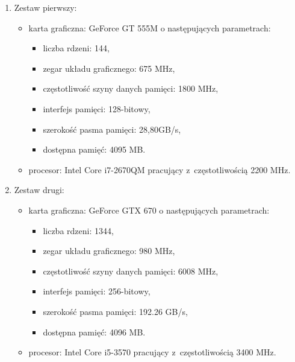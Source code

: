 \begin{enumerate}
\item Zestaw pierwszy:
\begin{itemize}
\item karta graficzna: GeForce GT 555M \cite{GT555M} o następujących parametrach:
\begin{itemize}
\item liczba rdzeni: 144,
\item zegar układu graficznego: 675 MHz,
\item częstotliwość szyny danych pamięci: 1800 MHz,
\item interfejs pamięci: 128-bitowy,
\item szerokość pasma pamięci: 28,80GB/s,
\item dostępna pamięć: 4095 MB.
\end{itemize}
\item procesor: Intel Core i7-2670QM pracujący z~częstotliwością 2200 MHz.
\end{itemize}

\item Zestaw drugi:
\begin{itemize}
\item karta graficzna: GeForce GTX 670 \cite{GTX670} o następujących parametrach:
\begin{itemize}
\item liczba rdzeni: 1344,
\item zegar układu graficznego: 980 MHz,
\item częstotliwość szyny danych pamięci: 6008 MHz,
\item interfejs pamięci: 256-bitowy,
\item szerokość pasma pamięci: 192.26 GB/s,
\item dostępna pamięć: 4096 MB.
\end{itemize}
\item procesor: Intel Core i5-3570 pracujący z~częstotliwością 3400 MHz.
\end{itemize}
\end{enumerate}

